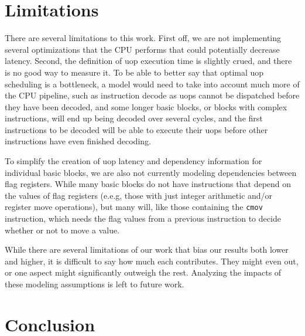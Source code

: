 \documentclass[sigconf]{acmart}
\begin{document}

\section{Limitations}

There are several limitations to this work. First off, we are not implementing several optimizations that the CPU
performs that could potentially decrease latency. Second, the definition of uop execution time is slightly crued,
and there is no good way to measure it. To be able to better say that optimal uop scheduling is a bottleneck, a model
would need to take into account much more of the CPU pipeline, such as instruction decode as uops cannot be dispatched
before they have been decoded, and some longer basic blocks, or blocks with complex instructions, will end up being decoded
over several cycles, and the first instructions to be decoded will be able to execute their uops before other instructions
have even finished decoding.

To simplify the creation of uop latency and dependency information for individual basic blocks, we are also not currently
modeling dependencies between flag registers. While many basic blocks do not have instructions that depend on the values
of flag registers (e.e.g, those with just integer arithmetic and/or register move operations), but many will, like those
containing the \texttt{cmov} instruction, which needs the flag values from a previous instruction to decide whether
or not to move a value.

While there are several limitations of our work that bias our results both lower and higher, it is difficult to say how much
each contributes. They might even out, or one aspect might significantly outweigh the rest. Analyzing the impacts of these
modeling assumptions is left to future work.

\section{Conclusion}
\end{document}
